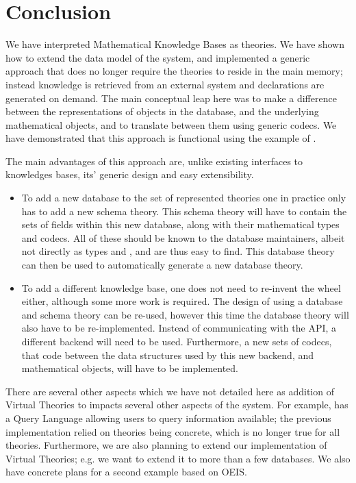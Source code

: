 \section{Conclusion}\label{sec:concl}

We have interpreted Mathematical Knowledge Bases as \ommt theories. 
We have shown how to extend the data model of the \mmt system, and implemented a generic approach that does no longer require the theories to reside in the main memory; instead knowledge is retrieved from an external system and declarations are generated on demand.
The main conceptual leap here was to make a difference between the representations of objects in the database, and the underlying mathematical objects, and to translate between them using generic codecs. 
We have demonstrated that this approach is functional using the example of \lmfdb. 

The main advantages of this approach are, unlike existing interfaces to knowledges bases, its' generic design and easy extensibility. 
\begin{itemize}
  \item
    To add a new \lmfdb database to the set of represented theories one in practice only has to add a new schema theory. 
    This schema theory will have to contain the sets of fields within this new database, along with their mathematical types and codecs. 
    All of these should be known to the database maintainers, albeit not directly as types and , and are thus easy to find. 
    This database theory can then be used to automatically generate a new database theory. 
  \item
    To add a different knowledge base, one does not need to re-invent the wheel either, although some more work is required. 
    The design of using a database and schema theory can be re-used, however this time the database theory will also have to be re-implemented. 
    Instead of communicating with the \lmfdb API, a different backend will need to be used. 
    Furthermore, a new sets of codecs, that code between the data structures used by this new backend, and mathematical objects, will have to be implemented. 
\end{itemize}

There are several other aspects which we have not detailed here as addition of Virtual Theories to \mmt impacts several other aspects of the system. 
For example, \mmt has a Query Language allowing users to query information available; the previous implementation relied on theories being concrete, which is no longer true for all theories.  
Furthermore, we are also planning to extend our implementation of Virtual Theories; e.g. we want to extend it to more than a few \lmfdb databases. 
We also have concrete plans for a second example based on OEIS. 

